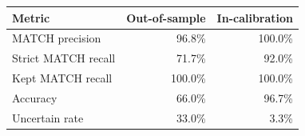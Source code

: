 \begin{tabular}{lrr}
\toprule
Metric & Out-of-sample & In-calibration \\
\midrule
MATCH precision & 96.8\% & 100.0\% \\
Strict MATCH recall & 71.7\% & 92.0\% \\
Kept MATCH recall & 100.0\% & 100.0\% \\
Accuracy & 66.0\% & 96.7\% \\
Uncertain rate & 33.0\% & 3.3\% \\
\bottomrule
\end{tabular}
